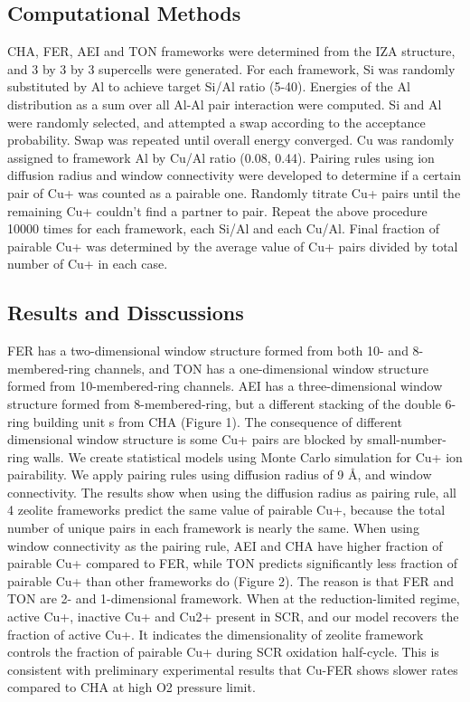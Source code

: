 \documentclass[12pt]{article}
\begin{document}
\subsection*{Computational Methods}

CHA, FER, AEI and TON frameworks were determined from the IZA structure, and 3 by 3 by 3 supercells were generated. For each framework, Si was randomly substituted by Al to achieve target Si/Al ratio (5-40). Energies of the Al distribution as a sum over all Al-Al pair interaction were computed. Si and Al were randomly selected, and attempted a swap according to the acceptance probability. Swap was repeated until overall energy converged. Cu was randomly assigned to framework Al by Cu/Al ratio (0.08, 0.44). Pairing rules using ion diffusion radius and window connectivity were developed to determine if a certain pair of Cu+ was counted as a pairable one. Randomly titrate Cu+ pairs until the remaining Cu+ couldn’t find a partner to pair. Repeat the above procedure 10000 times for each framework, each Si/Al and each Cu/Al. Final fraction of pairable Cu+ was determined by the average value of Cu+ pairs divided by total number of Cu+ in each case.

\subsection*{Results and Disscussions}

FER has a two-dimensional window structure formed from both 10- and 8-membered-ring channels, and TON has a one-dimensional window structure formed from 10-membered-ring channels. AEI has a three-dimensional window structure formed from 8-membered-ring, but a different stacking of the double 6-ring building unit s from CHA (Figure 1). The consequence of different dimensional window structure is some Cu+ pairs are blocked by small-number-ring walls. We create statistical models using Monte Carlo simulation for Cu+ ion pairability. We apply pairing rules using diffusion radius of 9 Å, and window connectivity. The results show when using the diffusion radius as pairing rule, all 4 zeolite frameworks predict the same value of pairable Cu+, because the total number of unique pairs in each framework is nearly the same. When using window connectivity as the pairing rule, AEI and CHA have higher fraction of pairable Cu+ compared to FER, while TON predicts significantly less fraction of pairable Cu+ than other frameworks do (Figure 2). The reason is that FER and TON are 2- and 1-dimensional framework. When at the reduction-limited regime, active Cu+, inactive Cu+ and Cu2+ present in SCR, and our model recovers the fraction of active Cu+. It indicates the dimensionality of zeolite framework controls the fraction of pairable Cu+ during SCR oxidation half-cycle. This is consistent with preliminary experimental results that Cu-FER shows slower rates compared to CHA at high O2 pressure limit.
\end{document}
